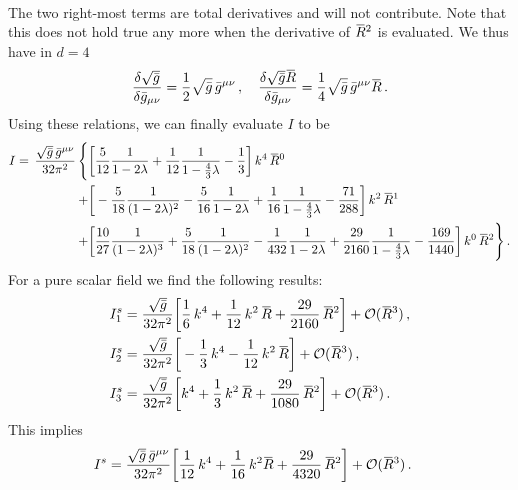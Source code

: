 \documentclass[11pt]{book}
\newcommand{\overbar}[1]{\mkern 1.5mu\overline{\mkern-1.5mu#1\mkern-1.5mu}\mkern 1.5mu}
\newcommand{\bR}{\overbar R}
\numberwithin{equation}{chapter}
\begin{document}
\begin{appendices}
\begin{align}
\end{align}
The two right-most terms are total derivatives and will not contribute.
Note that this does not hold true any more when the derivative of $\bR^2$ is evaluated.
We thus have in $d=4$
\begin{align}
  \frac{\delta \sqrt{\bar g}}{\delta \bar g_{\mu\nu}}
  = \frac 12 \sqrt{\bar g}\, \bar g^{\mu\nu} \,, \quad
  \frac{\delta \sqrt{\bar g} \bR}{\delta \bar g_{\mu\nu}}
  = \frac 14  \sqrt{\bar g}\, \bar g^{\mu\nu} \bR \,.
\end{align}
Using these relations, we can finally evaluate $I$ to be
\begin{align}
  \notag
  I = \, \frac{ \sqrt{\bar g} \, \bar g^{\mu\nu} }{ 32 \pi^2 } \,
  \Bigg\lbrace
  &\bigg[
    \frac 5{12} \frac{1}{1 - 2 \lambda}
    + \frac 1{12} \frac{1}{1 - \frac 43 \lambda}
    - \frac{1}{3}
    \bigg] \, k^4 \, \bR^0 \\ \notag
    + &\bigg[
      - \frac {5}{18} \frac{1}{(1 - 2 \lambda)^2}
      - \frac {5}{16} \frac{1}{1 - 2 \lambda}
      + \frac {1}{16} \frac{1}{1 - \frac 43 \lambda}
      - \frac {71}{288}
    \bigg] \, k^2 \, \bR^1 \\ \notag
    + &\bigg[
      \frac {10}{27} \frac{1}{(1 - 2 \lambda)^3}
      + \frac {5}{18} \frac{1}{(1 - 2 \lambda)^2}
      - \frac {1}{432} \frac{1}{1 - 2 \lambda}
      + \frac {29}{2160} \frac{1}{1 - \frac 43 \lambda}
      - \frac {169}{1440}
    \bigg] \, k^0 \, \bR^2
  \Bigg\rbrace
    \,.
\end{align}
For a pure scalar field we find the following results:
\begin{align}
  I_1^s
  &= \frac{ \sqrt{ \bar g} }{ 32 \pi^2 }
  \bigg[
      \frac{1}{6} \, k^4
    + \frac{1}{12} \, k^2 \, \bR
    + \frac{29}{2160} \, \bR^2
  \bigg]
  + \mathcal O (\bR^3) \,, \\
  I_2^s
  & = \frac{ \sqrt {\bar g} }{ 32 \pi^2 }
  \bigg[
    - \frac{1}{3} \, k^4
    - \frac{1}{12} \, k^2 \, \bR
  \bigg]
  + \mathcal O (\bR^3) \,, \\
  I_3^s
  & = \frac{ \sqrt {\bar g} }{ 32 \pi^2 }
  \bigg[
  k^4
  + \frac{1}{3} \, k^2 \, \bR
  + \frac{29}{1080} \, \bR^2
  \bigg]
  + \mathcal O (\bR^3) \,.
\end{align}
This implies
\begin{align}
  I^s &= \frac{ \sqrt{\bar g} \, \bar g^{\mu\nu} }{ 32 \pi^2 }
  \bigg[
    \frac{1}{12} \, k^4 + \frac{1}{16} \, k^2 \bR + \frac{29}{4320} \, \bR^2
  \bigg]
  + \mathcal O (\bR^3) \,.
\end{align}



\end{appendices}
\end{document}
